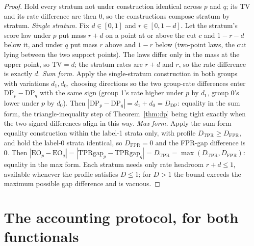 \documentclass[11pt]{article}
\begin{document}
\begin{proof}
Hold every stratum not under construction identical across $p$
and $q$; its TV and its rate difference are then $0$, so the
constructions compose stratum by stratum. \emph{Single stratum.}
Fix $d \in [0,1]$ and $r \in [0, 1-d]$. Let the stratum's score
law under $p$ put mass $r+d$ on a point at or above the cut $c$
and $1-r-d$ below it, and under $q$ put mass $r$ above and $1-r$
below (two-point laws, the cut lying between the two support
points). The laws differ only in the mass at the upper point, so
$\mathrm{TV} = d$; the stratum rates are $r+d$ and $r$, so the
rate difference is exactly $d$. \emph{Sum form.} Apply the
single-stratum construction in both groups with variations
$d_1, d_0$, choosing directions so the two group-rate differences
enter $\mathrm{DP}_p - \mathrm{DP}_q$ with the same sign (group
1's rate higher under $p$ by $d_1$, group 0's lower under $p$ by
$d_0$). Then $|\mathrm{DP}_p - \mathrm{DP}_q| = d_1 + d_0 =
D_{\mathrm{DP}}$: equality in the sum form, the triangle-inequality
step of Theorem~\ref{thm:dp} being tight exactly when the two
signed differences align in this way. \emph{Max form.} Apply the
sum-form equality construction within the label-1 strata only,
with profile $D_{\mathrm{TPR}} \ge D_{\mathrm{FPR}}$, and hold
the label-0 strata identical, so $D_{\mathrm{FPR}} = 0$ and the
FPR-gap difference is $0$. Then $|\mathrm{EO}_p -
\mathrm{EO}_q| = |\mathrm{TPRgap}_p - \mathrm{TPRgap}_q| =
D_{\mathrm{TPR}} = \max(D_{\mathrm{TPR}}, D_{\mathrm{FPR}})$:
equality in the max form. Each stratum needs only rate headroom
$r + d \le 1$, available whenever the profile satisfies $D \le
1$; for $D > 1$ the bound exceeds the maximum possible gap
difference and is vacuous.
\end{proof}

\section{The accounting protocol, for both functionals}
\label{sec:accounting}
\end{document}
